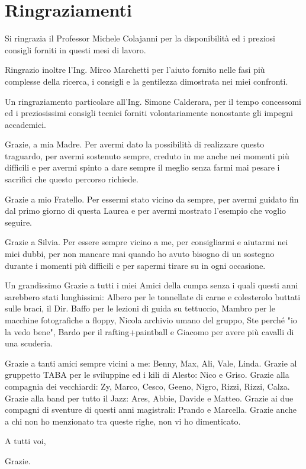 \chapter*{Ringraziamenti}

Si ringrazia il Professor Michele Colajanni per la disponibilità ed i preziosi consigli forniti in questi mesi di lavoro.

Ringrazio inoltre l'Ing. Mirco Marchetti per l'aiuto fornito nelle fasi più complesse della ricerca, i consigli e la gentilezza dimostrata nei miei confronti.

Un ringraziamento particolare all'Ing. Simone Calderara, per il tempo concessomi ed i preziosissimi consigli tecnici forniti volontariamente nonostante gli impegni accademici.

Grazie, a mia Madre. Per avermi dato la possibilità di realizzare questo traguardo, per avermi sostenuto sempre, creduto in me anche nei momenti più difficili e per avermi spinto a dare sempre il meglio senza farmi mai pesare i sacrifici che questo percorso richiede.

Grazie a mio Fratello. Per essermi stato vicino da sempre, per avermi guidato fin dal primo giorno di questa Laurea e per avermi mostrato l'esempio che voglio seguire.

Grazie a Silvia. Per essere sempre vicino a me, per consigliarmi e aiutarmi nei miei dubbi, per non mancare mai quando ho avuto bisogno di un sostegno durante i momenti più difficili e per sapermi tirare su in ogni occasione.

Un grandissimo Grazie a tutti i miei Amici della cumpa senza i quali questi anni sarebbero stati lunghissimi: Albero per le tonnellate di carne e colesterolo buttati sulle braci, il Dir. Baffo per le lezioni di guida su tettuccio, Mambro per le macchine fotografiche a floppy, Nicola archivio umano del gruppo, Ste perché "io la vedo bene", Bardo per il rafting+paintball e Giacomo per avere più cavalli di una scuderia.

Grazie a tanti amici sempre vicini a me: Benny, Max, Ali, Vale, Linda. Grazie al gruppetto TABA per le sviluppine ed i kili di Alesto: Nico e Griso. Grazie alla compagnia dei vecchiardi: Zy, Marco, Cesco, Geeno, Nigro, Rizzi, Rizzi, Calza. Grazie alla band per tutto il Jazz: Ares, Abbie, Davide e Matteo. Grazie ai due compagni di sventure di questi anni magistrali: Prando e Marcella. Grazie anche a chi non ho menzionato tra queste righe, non vi ho dimenticato.

A tutti voi,

Grazie.
